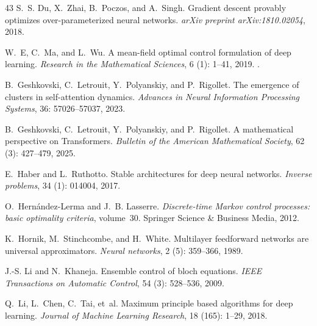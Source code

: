 \documentclass[11pt]{article}
\begin{document}
\begin{thebibliography}{43}
S.~S. Du, X.~Zhai, B.~Poczos, and A.~Singh.
\newblock Gradient descent provably optimizes over-parameterized neural networks.
\newblock \emph{arXiv preprint arXiv:1810.02054}, 2018.

W.~E, C.~Ma, and L.~Wu.
\newblock A mean-field optimal control formulation of deep learning.
\newblock \emph{Research in the Mathematical Sciences}, 6 (1): 1--41, 2019.
\newblock {}.

B.~Geshkovski, C.~Letrouit, Y.~Polyanskiy, and P.~Rigollet.
\newblock The emergence of clusters in self-attention dynamics.
\newblock \emph{Advances in Neural Information Processing Systems}, 36: 57026--57037, 2023.

B.~Geshkovski, C.~Letrouit, Y.~Polyanskiy, and P.~Rigollet.
\newblock A mathematical perspective on {T}ransformers.
\newblock \emph{Bulletin of the American Mathematical Society}, 62 (3): 427--479, 2025.

E.~Haber and L.~Ruthotto.
\newblock Stable architectures for deep neural networks.
\newblock \emph{Inverse problems}, 34 (1): 014004, 2017.

O.~Hern{\'a}ndez-Lerma and J.~B. Lasserre.
\newblock \emph{Discrete-time {Markov} control processes: basic optimality criteria}, volume~30.
\newblock Springer Science \& Business Media, 2012.

K.~Hornik, M.~Stinchcombe, and H.~White.
\newblock Multilayer feedforward networks are universal approximators.
\newblock \emph{Neural networks}, 2 (5): 359--366, 1989.

J.-S. Li and N.~Khaneja.
\newblock Ensemble control of bloch equations.
\newblock \emph{IEEE Transactions on Automatic Control}, 54 (3): 528--536, 2009.

Q.~Li, L.~Chen, C.~Tai, et~al.
\newblock Maximum principle based algorithms for deep learning.
\newblock \emph{Journal of Machine Learning Research}, 18 (165): 1--29, 2018.


\end{thebibliography}
\end{document}
